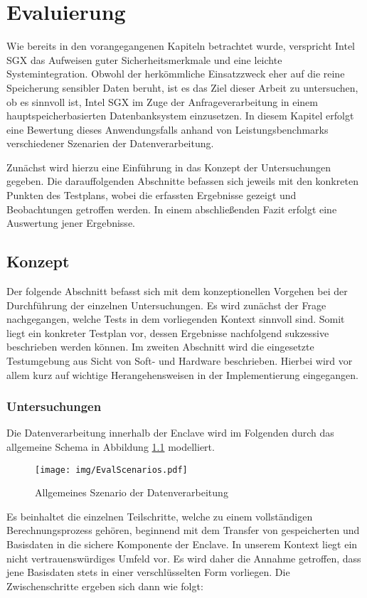 
\chapter{Evaluierung}

Wie bereits in den vorangegangenen Kapiteln betrachtet wurde, verspricht Intel SGX das Aufweisen guter Sicherheitsmerkmale und eine leichte Systemintegration. Obwohl der herkömmliche Einsatzzweck eher auf die reine Speicherung sensibler Daten beruht, ist es das Ziel dieser Arbeit zu untersuchen, ob es sinnvoll ist, Intel SGX im Zuge der Anfrageverarbeitung in einem hauptspeicherbasierten Datenbanksystem einzusetzen. In diesem Kapitel erfolgt eine Bewertung dieses Anwendungsfalls anhand von Leistungsbenchmarks verschiedener Szenarien der Datenverarbeitung.

Zunächst wird hierzu eine Einführung in das Konzept der Untersuchungen gegeben. Die darauffolgenden Abschnitte befassen sich jeweils mit den konkreten Punkten des Testplans, wobei die erfassten Ergebnisse gezeigt und Beobachtungen getroffen werden. In einem abschließenden Fazit erfolgt eine Auswertung jener Ergebnisse.

\section{Konzept}

Der folgende Abschnitt befasst sich mit dem konzeptionellen Vorgehen bei der Durchführung der einzelnen Untersuchungen. Es wird zunächst der Frage nachgegangen, welche Tests in dem vorliegenden Kontext sinnvoll sind. Somit liegt ein konkreter Testplan vor, dessen Ergebnisse nachfolgend sukzessive beschrieben werden können. Im zweiten Abschnitt wird die eingesetzte Testumgebung aus Sicht von Soft- und Hardware beschrieben. Hierbei wird vor allem kurz auf wichtige Herangehensweisen in der Implementierung eingegangen.

\subsection{Untersuchungen}

Die Datenverarbeitung innerhalb der Enclave wird im Folgenden durch das allgemeine Schema in Abbildung \ref{fig:scenarios} modelliert.
\begin{figure}[h]
	\texttt{[image: img/EvalScenarios.pdf]}
	\centering
	\caption{Allgemeines Szenario der Datenverarbeitung}
	\label{fig:scenarios}
\end{figure} 
Es beinhaltet die einzelnen Teilschritte, welche zu einem vollständigen Berechnungsprozess gehören, beginnend mit dem Transfer von gespeicherten und Basisdaten in die sichere Komponente der Enclave. In unserem Kontext liegt ein nicht vertrauenswürdiges Umfeld vor. Es wird daher die Annahme getroffen, dass jene Basisdaten stets in einer verschlüsselten Form vorliegen. Die Zwischenschritte ergeben sich dann wie folgt:

